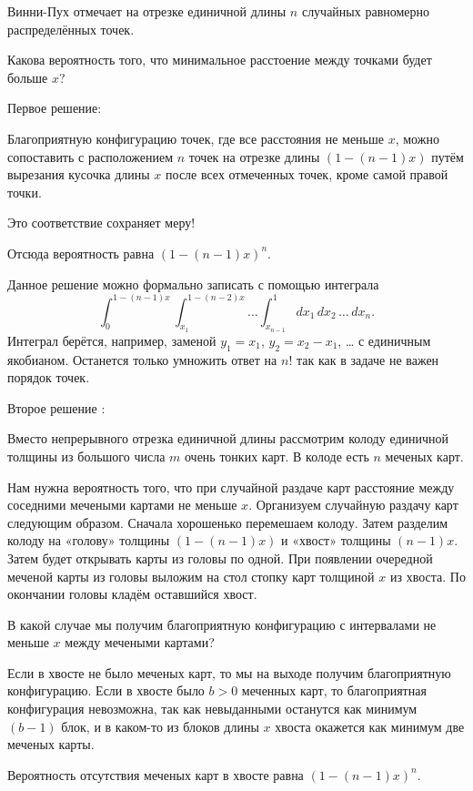 \documentclass[12pt, a4paper]{article}
\newcounter{problem}[section]
\newenvironment{problem}%
{%
\refstepcounter{problem}%
     \hypertarget{problem:{\thesection.\theproblem}}{} %
     \Writetofile{solution_file}{\protect\hypertarget{soln:\thesection.\theproblem}{}}
     \begin{myenum}[label=\bfseries\protect\hyperlink{soln:\thesection.\theproblem}{\thesection.\theproblem},ref=\thesection.\theproblem]
     \item%
    }%
    {%
    \end{myenum}}
\begin{document}
\begin{problem}
Винни-Пух отмечает на отрезке единичной длины $n$ случайных равномерно распределённых точек.

Какова вероятность того, что минимальное расстоение между точками будет больше $x$?
\begin{sol}  
Первое решение:

Благоприятную конфигурацию точек, где все расстояния не меньше $x$, можно сопоставить 
с расположением $n$ точек на отрезке длины $(1 - (n-1) x)$ путём вырезания кусочка длины $x$ после всех отмеченных точек, кроме самой правой точки. 

Это соответствие сохраняет меру!

Отсюда вероятность равна $(1 - (n-1) x)^n$.

Данное решение можно формально записать с помощью интеграла
\[
\int_0^{1 - (n-1)x} \int_{x_1}^{1 - (n-2)x} \dots \int_{x_{n-1}}^1 dx_1 \, dx_2 \, \dots \, dx_n.
\]
Интеграл берётся, например, заменой $y_1 = x_1$, $y_2 = x_2 - x_1$, \dots{ } с единичным якобианом. 
Останется только умножить ответ на $n!$ так как в задаче не важен порядок точек.

Второе решение \autocite{1294}:

Вместо непрерывного отрезка единичной длины рассмотрим колоду единичной толщины из большого числа $m$ очень тонких карт. 
В колоде есть $n$ меченых карт. 

Нам нужна вероятность того, что при случайной раздаче карт расстояние между соседними мечеными картами не меньше $x$. 
Организуем случайную раздачу карт следующим образом. 
Сначала хорошенько перемешаем колоду. 
Затем разделим колоду на «голову» толщины $(1 - (n-1)x)$ и «хвост» толщины $(n-1)x$.
Затем будет открывать карты из головы по одной.
При появлении очередной меченой карты из головы выложим на стол стопку карт толщиной $x$ из хвоста.
По окончании головы кладём оставшийся хвост. 

В какой случае мы получим благоприятную конфигурацию с интервалами не меньше $x$ между мечеными картами?

Если в хвосте не было меченых карт, то мы на выходе получим благоприятную конфигурацию.
Если в хвосте было $b > 0$ меченных карт, то благоприятная конфигурация невозможна,
так как невыданными останутся как минимум $(b - 1)$ блок, и в каком-то из блоков длины $x$ хвоста окажется как минимум две меченых карты.

Вероятность отсутствия меченых карт в хвосте равна $(1 - (n-1)x)^n$. 
\end{sol}
\end{problem}
\end{document}
